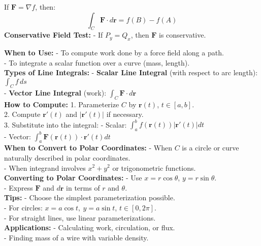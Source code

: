\documentclass[9pt]{article}
\begin{document}
\begin{multicols}{2}
\begin{tcolorbox}[title=\textbf{Fundamental Theorem for Line Integrals}, colframe=lightblue]
   If \( \mathbf{F} = \nabla f \), then:
   \[ \int_C \mathbf{F} \cdot d\mathbf{r} = f(B) - f(A) \]
   \textbf{Conservative Field Test:}
   - If \( P_y = Q_x \), then \( \mathbf{F} \) is conservative.
   \end{tcolorbox}   

\begin{tcolorbox}[title=\textbf{Line Integrals}, colframe=lightyellow]
\textbf{When to Use:}
- To compute work done by a force field along a path. \\
- To integrate a scalar function over a curve (mass, length). \\
\textbf{Types of Line Integrals:}
- \textbf{Scalar Line Integral} (with respect to arc length): \( \int_C f \, ds \) \\
- \textbf{Vector Line Integral} (work): \( \int_C \mathbf{F} \cdot d\mathbf{r} \) \\
\textbf{How to Compute:}
1. Parameterize \( C \) by \( \mathbf{r}(t) \), \( t \in [a, b] \). \\
2. Compute \( \mathbf{r}'(t) \) and \( |\mathbf{r}'(t)| \) if necessary. \\
3. Substitute into the integral:
   - Scalar: \( \int_a^b f(\mathbf{r}(t)) |\mathbf{r}'(t)| dt \) \\
   - Vector: \( \int_a^b \mathbf{F}(\mathbf{r}(t)) \cdot \mathbf{r}'(t) dt \) \\
\textbf{When to Convert to Polar Coordinates:}
- When \( C \) is a circle or curve naturally described in polar coordinates. \\
- When integrand involves \( x^2 + y^2 \) or trigonometric functions. \\
\textbf{Converting to Polar Coordinates:}
- Use \( x = r \cos \theta \), \( y = r \sin \theta \). \\
- Express \( \mathbf{F} \) and \( d\mathbf{r} \) in terms of \( r \) and \( \theta \). \\
\textbf{Tips:}
- Choose the simplest parameterization possible. \\
- For circles: \( x = a \cos t,\ y = a \sin t \), \( t \in [0, 2\pi] \). \\
- For straight lines, use linear parameterizations. \\
\textbf{Applications:}
- Calculating work, circulation, or flux. \\
- Finding mass of a wire with variable density.
\end{tcolorbox}



\end{multicols}
\end{document}
